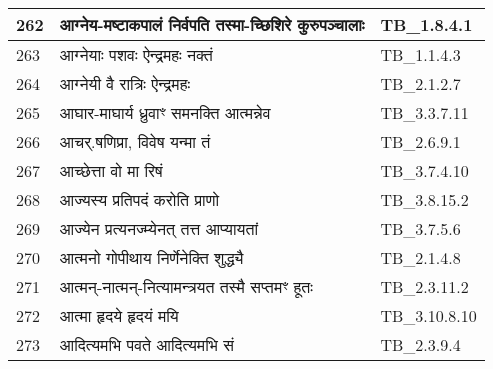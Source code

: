 \documentclass[17pt]{extarticle}
\begin{document}
\begin{longtable}{||p{0.4in}||p{4.9in}||p{0.9in}||}
    \hline
        
    262 & आग्नेय{-}मष्टाकपालं निर्वपति तस्मा{-}च्छिशिरे कुरुपञ्चालाः & TB\_1.8.4.1       \\
    
    \hline
        
    263 & आग्नेयाः पशवः ऐन्द्रमहः नक्तं & TB\_1.1.4.3       \\
    
    \hline
        
    264 & आग्नेयी वै रात्रिः ऐन्द्रमहः & TB\_2.1.2.7       \\
    
    \hline
        
    265 & आघार{-}माघार्य ध्रुवाꣳ समनक्ति आत्मन्नेव & TB\_3.3.7.11       \\
    
    \hline
        
    266 & आचर्.षणिप्रा, विवेष यन्मा तं & TB\_2.6.9.1       \\
    
    \hline
        
    267 & आच्छेत्ता वो मा रिषं & TB\_3.7.4.10       \\
    
    \hline
        
    268 & आज्यस्य प्रतिपदं करोति प्राणो & TB\_3.8.15.2       \\
    
    \hline
        
    269 & आज्येन प्रत्यनज्म्येनत् तत्त आप्यायतां & TB\_3.7.5.6       \\
    
    \hline
        
    270 & आत्मनो गोपीथाय निर्णेनेक्ति शुद्ध्यै & TB\_2.1.4.8       \\
    
    \hline
        
    271 & आत्मन्{-}नात्मन्{-}नित्यामन्त्रयत तस्मै सप्तमꣳ हूतः & TB\_2.3.11.2       \\
    
    \hline
        
    272 & आत्मा हृदये हृदयं मयि & TB\_3.10.8.10       \\
    
    \hline
        
    273 & आदित्यमभि पवते आदित्यमभि सं & TB\_2.3.9.4       \\
    
    \hline
        

\end{longtable}
\end{document}
